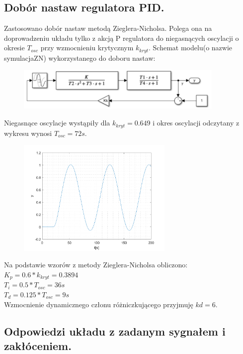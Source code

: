 \documentclass[a4paper]{article}
\begin{document}
\subsection{Dobór nastaw regulatora PID.}
Zastosowano dobór nastaw metodą Zieglera-Nicholsa. Polega ona na doprowadzeniu układu tylko z akcją P regulatora do niegasnących oscylacji o okresie $T_{osc}$ przy wzmocnieniu krytycznym $k_{kryt}$.
Schemat modelu(o nazwie symulacjaZN) wykorzystanego do doboru nastaw:
\begin{figure}[H]
	\centering
	\includegraphics[width=10cm]{modelsymulacjaZN} 
\end{figure}
Niegasnące oscylacje wystąpiły dla $k_{kryt}=0.649$ i okres oscylacji odczytany z wykresu wynosi $T_{osc}=72s$.
\begin{figure}[H]
	\centering
	\includegraphics[width=7.5cm]{pkt4} 
\end{figure}
Na podstawie wzorów z metody Zieglera-Nicholsa obliczono: \\
$K_p=0.6*k_{kryt}=0.3894$ \\
$T_i=0.5*T_{osc}=36s$ \\
$T_d=0.125*T_{osc}=9s$ \\
Wzmocnienie dynamicznego członu różniczkującego przyjmuję $kd=6$.
\subsection{Odpowiedzi układu z zadanym sygnałem i zakłóceniem.}
\end{document}
